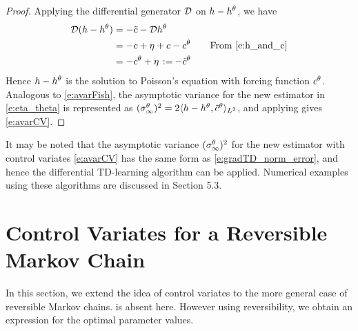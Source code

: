 \begin{proof}
	Applying the differential generator ${\cal D}$ on $h - h^\theta$, we have
	\begin{equation}
	\begin{aligned}
	\generate ( h -h^\param) & = - \tilc - \generate h^\param\\
	& = - c + \eta + c - c^\param  \qquad \text{From \eqref{e:h_and_c}} \\
	& = - c^\param + \eta\, \eqdef -\tilc^\param
	\end{aligned}	
	\label{e:proof_i}
	\end{equation}
	Hence $h-h^\theta$ is the solution to Poisson's equation with forcing function $c^\theta$. Analogous to \eqref{e:avarFish}, the asymptotic variance for the new estimator in \eqref{e:eta_theta} is represented as $(\sigma_\infty^\theta)^2 = 2 \langle h - h^\theta, \tilde c^\theta \rangle_{L^2}$, and applying  gives \eqref{e:avarCV}.
\end{proof}

It may be noted that the asymptotic variance $(\sigma_\infty^\theta)^2$ for the new estimator with control variates \eqref{e:avarCV} has the same form as \eqref{e:gradTD_norm_error}, and hence the differential TD-learning algorithm can be applied. Numerical examples using these algorithms are discussed in Section 5.3.  %

\section {Control Variates for a Reversible Markov Chain} %
\label{s:cv_reversible_mc}
In this section, we extend the idea of control variates to the more general case of reversible Markov chains.  is absent here. However using reversibility, we obtain an expression for the optimal parameter values.

